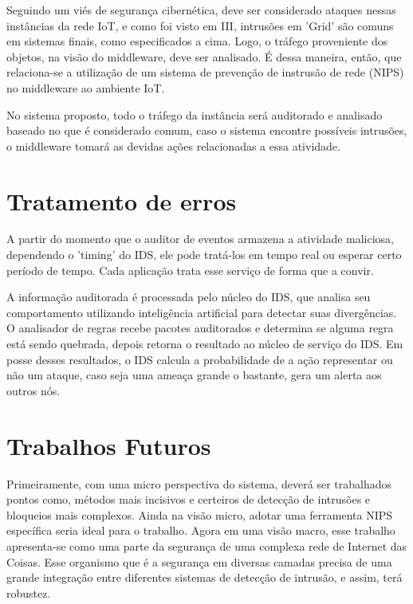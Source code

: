 \documentclass[journal]{IEEEtran}
\begin{document}
Seguindo um viés de segurança cibernética, deve ser considerado ataques nessas instâncias da rede IoT, e como foi visto em III, intrusões em 'Grid' são comuns em sistemas finais, como especificados a cima. Logo, o tráfego proveniente dos objetos, na visão do middleware, deve ser analisado. É dessa maneira, então, que relaciona-se a utilização de um sistema de prevenção de instrusão de rede (NIPS) no middleware ao ambiente IoT. \par

No sistema proposto, todo o tráfego da instância será auditorado e analisado baseado no que é considerado comum, caso o sistema encontre possíveis intrusões, o middleware tomará as devidas ações relacionadas a essa atividade.

\section{Tratamento de erros}
A partir do momento que o auditor de eventos armazena a atividade maliciosa, dependendo o 'timing' do IDS, ele pode tratá-los em tempo real ou esperar certo período de tempo. Cada aplicação trata esse serviço de forma que a convir. \par
A informação auditorada é processada pelo núcleo do IDS, que analisa seu comportamento utilizando inteligência artificial para detectar suas divergências. O analisador de regras recebe pacotes auditorados e determina se alguma regra está sendo quebrada, depois retorna o resultado ao núcleo de serviço do IDS. Em posse desses resultados, o IDS calcula a probabilidade de a ação representar ou não um ataque, caso seja uma ameaça grande o bastante, gera um alerta aos outros nós.

\section{Trabalhos Futuros}
Primeiramente, com uma micro perspectiva do sistema, deverá ser trabalhados pontos como, métodos mais incisivos e certeiros de detecção de intrusões e bloqueios mais complexos. Ainda na visão micro, adotar uma ferramenta NIPS específica seria ideal para o trabalho.
Agora em uma visão macro, esse trabalho apresenta-se como uma parte da segurança de uma complexa rede de Internet das Coisas. Esse organismo que é a segurança em diversas camadas precisa de uma grande integração entre diferentes sistemas de detecção de intrusão, e assim, terá robustez.
\end{document}
